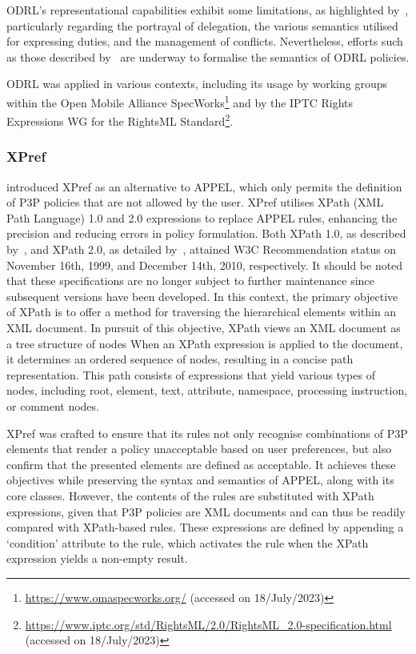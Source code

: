 ODRL's representational capabilities exhibit some limitations, as highlighted by~\cite{kebede_critical_2020}, particularly regarding the portrayal of delegation, the various semantics utilised for expressing duties, and the management of conflicts.
Nevertheless, efforts such as those described by~\cite{fornara_operational_2018, fornara_using_2019} are underway to formalise the semantics of ODRL policies.

ODRL was applied in various contexts, including its usage by working groups within the Open Mobile Alliance SpecWorks\footnote{\url{https://www.omaspecworks.org/} (accessed on 18/July/2023)} and by the IPTC Rights Expressions WG for the RightsML Standard\footnote{\url{https://www.iptc.org/std/RightsML/2.0/RightsML_2.0-specification.html} (accessed on 18/July/2023)}.

\subsubsection{XPref}
\label{sec:xpref}

\cite{agrawal_xpref_2005} introduced XPref as an alternative to APPEL, which only permits the definition of P3P policies that are not allowed by the user.
XPref utilises XPath (XML Path Language) 1.0 and 2.0 expressions to replace APPEL rules, enhancing the precision and reducing errors in policy formulation.
Both XPath 1.0, as described by~\cite{clark_xml_1999}, and XPath 2.0, as detailed by~\cite{berglund_xml_2010}, attained W3C Recommendation status on November 16th, 1999, and December 14th, 2010, respectively.
It should be noted that these specifications are no longer subject to further maintenance since subsequent versions have been developed.
In this context, the primary objective of XPath is to offer a method for traversing the hierarchical elements within an XML document.
In pursuit of this objective, XPath views an XML document as a tree structure of nodes
When an XPath expression is applied to the document, it determines an ordered sequence of nodes, resulting in a concise path representation.
This path consists of expressions that yield various types of nodes, including root, element, text, attribute, namespace, processing instruction, or comment nodes.

XPref was crafted to ensure that its rules not only recognise combinations of P3P elements that render a policy unacceptable based on user preferences, but also confirm that the presented elements are defined as acceptable.
It achieves these objectives while preserving the syntax and semantics of APPEL, along with its core classes.
However, the contents of the rules are substituted with XPath expressions, given that P3P policies are XML documents and can thus be readily compared with XPath-based rules.
These expressions are defined by appending a `condition' attribute to the rule, which activates the rule when the XPath expression yields a non-empty result.

